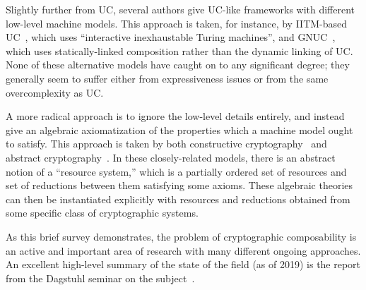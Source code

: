 Slightly further from UC, several authors give UC-like frameworks with different
low-level machine models. This approach is taken, for instance, by IITM-based
UC~\cite{camenisch-et-al-2019}, which uses ``interactive inexhaustable Turing
machines'', and GNUC~\cite{hofheinz-shoup-2011}, which uses statically-linked
composition rather than the dynamic linking of UC. None of these alternative
models have caught on to any significant degree; they generally seem to suffer
either from expressiveness issues or from the same overcomplexity as UC.

A more radical approach is to ignore the low-level details entirely, and
instead give an algebraic axiomatization of the properties which a machine model
ought to satisfy. This approach is taken by both constructive
cryptography~\cite{maurer-et-al-2012} and abstract
cryptography~\cite{maurer-renner-2011}.  In these closely-related models, there
is an abstract notion of a ``resource system,'' which is a partially ordered set
of resources and set of reductions between them satisfying some axioms. These
algebraic theories can then be instantiated explicitly with resources and
reductions obtained from some specific class of cryptographic systems.

As this brief survey demonstrates, the problem of cryptographic composability is
an active and important area of research with many different ongoing approaches.
An excellent high-level summary of the state of the field (as of 2019) is the
report from the Dagstuhl seminar on the subject~\cite{camenisch-et-al-2019}.
